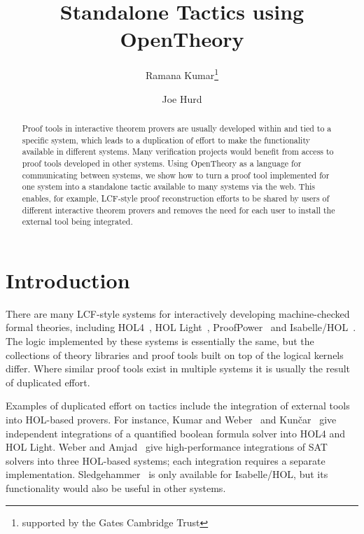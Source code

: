 \documentclass{llncs}
\newcommand{\OpenTheory}{OpenTheory\xspace}
\begin{document}
\title{Standalone Tactics using OpenTheory}

\author{Ramana Kumar\thanks{supported by the Gates Cambridge Trust}\and Joe Hurd}


\maketitle

\begin{abstract}
Proof tools in interactive theorem provers are usually developed within and tied to a specific system, which leads to a duplication of effort to make the functionality available in different systems.
Many verification projects would benefit from access to proof tools developed in other systems.
Using \OpenTheory as a language for communicating between systems, we show how to turn a proof tool implemented for one system into a standalone tactic available to many systems via the web.
This enables, for example, LCF-style proof reconstruction efforts to be shared by users of different interactive theorem provers and removes the need for each user to install the external tool being integrated.
\end{abstract}

\section{Introduction}

There are many LCF-style systems for interactively developing machine-checked formal theories, including HOL4~\cite{slind08brief}, HOL Light~\cite{DBLP:conf/tphol/Harrison09a}, ProofPower~\cite{ProofPower} and Isabelle/HOL~\cite{wenzel08isabelle}.
The logic implemented by these systems is essentially the same, but the collections of theory libraries and proof tools built on top of the logical kernels differ.
Where similar proof tools exist in multiple systems it is usually the result of duplicated effort.

Examples of duplicated effort on tactics include the integration of external tools into HOL-based provers.
For instance, Kumar and Weber~\cite{DBLP:conf/itp/KumarW11} and Kun\v{c}ar~\cite{DBLP:conf/itp/Kuncar11} give independent integrations of a quantified boolean formula solver into HOL4 and HOL Light.
Weber and Amjad~\cite{weber09efficiently} give high-performance integrations of SAT solvers into three HOL-based systems; each integration requires a separate implementation.
Sledgehammer~\cite{DBLP:conf/frocos/BlanchetteBN11} is only available for Isabelle/HOL, but its functionality would also be useful in other systems.
\end{document}
